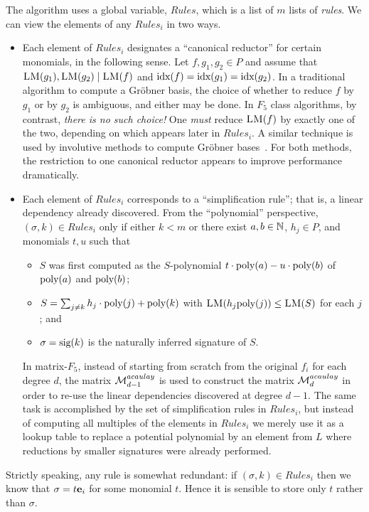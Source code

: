 The algorithm uses a global variable, $Rules$, which is a list of $m$ lists of \emph{rules}. We can view the elements of any $Rules_i$ in two ways.
\begin{itemize}
\item Each element of $Rules_i$ designates a ``canonical reductor'' for certain monomials, in the following sense.
Let $f, g_1, g_2\in P$ and assume that $\textsc{LM}(g_1),\textsc{LM}(g_2)\mid\textsc{LM}(f)$ and $\textnormal{idx}(f)=\textnormal{idx}(g_1)=\textnormal{idx}(g_2)$. In a traditional algorithm to compute a Gr\"obner basis, the choice of whether to reduce $f$ by $g_1$ or by $g_2$ is ambiguous, and either may be done.
In $F_5$ class algorithms, by contrast, \emph{there is no such choice!} One \emph{must} reduce $\textsc{LM}(f)$ by exactly one of the two, depending on
which appears later in $Rules_i$. A similar technique is used by involutive methods to compute Gr\"obner bases~\cite{involutive}.
For both methods, the restriction to one canonical reductor appears to improve performance dramatically.
\item Each element of $Rules_i$ corresponds to a ``simplification rule''; that is, a linear dependency already discovered. From the ``polynomial'' perspective, $(\sigma,k)\in Rules_i$ only if either $k < m$ or there exist $a,b\in\mathbb{N}$, $h_j\in P$, and monomials $t,u$ such that
\begin{itemize}
\item $S$ was first computed as the $S$-polynomial $t\cdot\textnormal{poly}(a) - u\cdot\textnormal{poly}(b)$  of $\textnormal{poly}(a)$ and $\textnormal{poly}(b)$;
\item $S = \sum_{j\neq k}h_j\cdot\textnormal{poly}(j) + \textnormal{poly}(k)$ with $\textsc{LM}(h_j\textnormal{poly}(j))\leq\textsc{LM}(S)$ for each $j$; and
\item $\sigma = \textnormal{sig}(k)$ is the naturally inferred signature of $S$.
\end{itemize}
In matrix-$F_5$, instead of starting from scratch from the original $f_i$ for each degree $d$, the matrix $\mathcal{M}^{acaulay}_{d-1}$ is used to construct the matrix $\mathcal{M}^{acaulay}_{d}$ in order to re-use the linear dependencies discovered at degree $d-1$. The same task is accomplished by the set of simplification rules in $Rules_i$, but instead of computing all multiples of the elements in $Rules_i$ we merely use it as a lookup table to replace a potential polynomial by an element from $L$ where reductions by smaller signatures were already performed.
\end{itemize}

Strictly speaking, any rule is somewhat redundant: if $(\sigma,k)\in Rules_i$ then we know that $\sigma=t\mathbf{e}_i$ for some monomial $t$. Hence it is sensible to store only $t$ rather than $\sigma$.


